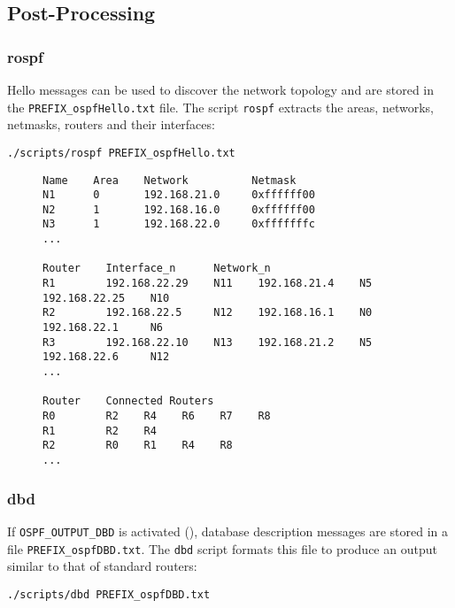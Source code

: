 \documentclass[documentation]{subfiles}
\begin{document}
\subsection{Post-Processing}\label{s:ospf-pp}

\subsubsection{rospf}
Hello messages can be used to discover the network topology and are stored in the {\tt PREFIX\_ospfHello.txt} file.
The script {\tt rospf} extracts the areas, networks, netmasks, routers and their interfaces:
\begin{center}
    {\tt ./scripts/rospf PREFIX\_ospfHello.txt}
\end{center}

\begin{figure}[!ht]
\centering
\begin{lstlisting}
Name    Area    Network          Netmask
N1      0       192.168.21.0     0xffffff00
N2      1       192.168.16.0     0xffffff00
N3      1       192.168.22.0     0xfffffffc
...

Router    Interface_n      Network_n
R1        192.168.22.29    N11    192.168.21.4    N5    192.168.22.25    N10
R2        192.168.22.5     N12    192.168.16.1    N0    192.168.22.1     N6
R3        192.168.22.10    N13    192.168.21.2    N5    192.168.22.6     N12
...

Router    Connected Routers
R0        R2    R4    R6    R7    R8
R1        R2    R4
R2        R0    R1    R4    R8
...
\end{lstlisting}
\end{figure}

\subsubsection{dbd}
If {\tt OSPF\_OUTPUT\_DBD} is activated (), database description messages are stored in a file {\tt PREFIX\_ospfDBD.txt}.
The {\tt dbd} script formats this file to produce an output similar to that of standard routers:
\begin{center}
    {\tt ./scripts/dbd PREFIX\_ospfDBD.txt}
\end{center}
\end{document}
